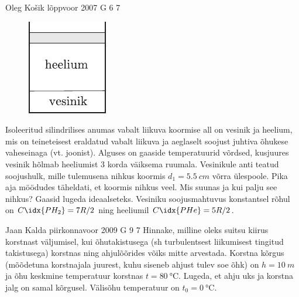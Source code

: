 \documentclass[11pt, twoside]{article}
\begin{document}
{%
{Oleg Košik} %
{lõppvoor} %
{2007} %
{G 6} %
{7} %
{
\ifStatement
\begin{figure}
	\begin{center}
		\vspace{-20pt}
		\includegraphics[width=0.95\linewidth]{2007-v3g-06-yl}
	\end{center}
\end{figure}
Isoleeritud silindrilises anumas vabalt liikuva koormise all on vesinik ja heelium, mis on teineteisest eraldatud vabalt liikuva ja aeglaselt soojust juhtiva õhukese vaheseinaga (vt. joonist). Alguses on gaaside temperatuurid võrdsed, kusjuures vesinik hõlmab heeliumist 3 korda väiksema ruumala. Vesinikule anti teatud soojushulk, mille tulemusena nihkus koormis $d_1 = \SI{5,5}{cm}$ võrra ülespoole. Pika aja möödudes täheldati, et koormis nihkus veel. Mis suunas ja kui palju see nihkus? Gaasid lugeda ideaalseteks. Vesiniku soojusmahtuvus konstantsel rõhul on $C\idx{PH_2} = 7R/2$ ning heeliumil $C\idx{PHe} = 5R/2$.
\fi
}

{Jaan Kalda} %
{piirkonnavoor} %
{2009} %
{G 9} %
{7} %
{
\ifStatement
Hinnake, milline oleks suitsu kiirus korstnast väljumisel, kui õhutakistusega (sh turbulentsest liikumisest tingitud takistusega) korstnas ning ahjulõõrides võiks mitte arvestada.
Korstna kõrgus (mõõdetuna korstnajala juurest, kuhu siseneb ahjust tulev soe õhk) on $h=\SI{10}{m}$ ja õhu keskmine temperatuur korstnas $t=\SI{80}{\celsius}$. Lugeda, et ahju uks ja korstna jalg on samal kõrgusel. Välisõhu temperatuur on $t_0=\SI{0}{\celsius}$.
\fi
}

}
\end{document}

